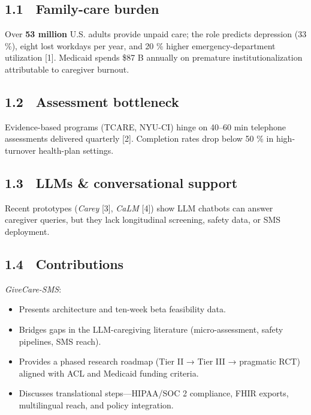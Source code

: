 \subsection{1.1 Family-care burden}\label{family-care-burden}

Over \textbf{53 million} U.S. adults provide unpaid care; the role
predicts depression (33 \%), eight lost workdays per year, and 20 \%
higher emergency-department utilization {[}1{]}. Medicaid spends \$87 B
annually on premature institutionalization attributable to caregiver
burnout.

\subsection{1.2 Assessment bottleneck}\label{assessment-bottleneck}

Evidence-based programs (TCARE, NYU-CI) hinge on 40--60 min telephone
assessments delivered quarterly {[}2{]}. Completion rates drop below 50
\% in high-turnover health-plan settings.

\subsection{1.3 LLMs \& conversational
support}\label{llms-conversational-support}

Recent prototypes (\emph{Carey} {[}3{]}, \emph{CaLM} {[}4{]}) show LLM
chatbots can answer caregiver queries, but they lack longitudinal
screening, safety data, or SMS deployment.

\subsection{1.4 Contributions}\label{contributions}

\emph{GiveCare-SMS}:

\begin{itemize}
\tightlist
\item
  Presents architecture and ten-week beta feasibility data.\\
\item
  Bridges gaps in the LLM-caregiving literature (micro-assessment,
  safety pipelines, SMS reach).\\
\item
  Provides a phased research roadmap (Tier II → Tier III → pragmatic
  RCT) aligned with ACL and Medicaid funding criteria.\\
\item
  Discusses translational steps---HIPAA/SOC 2 compliance, FHIR exports,
  multilingual reach, and policy integration.
\end{itemize}

